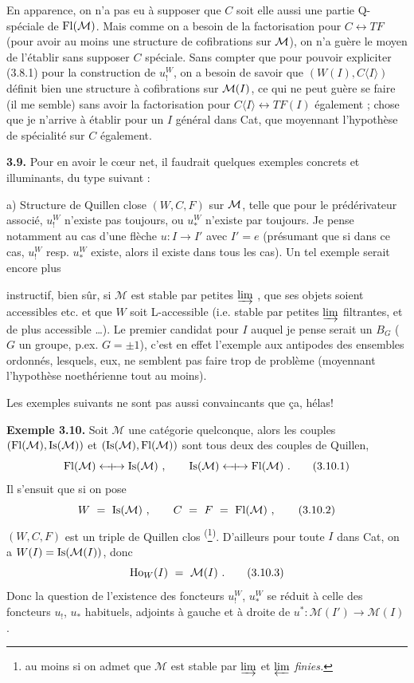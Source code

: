 En apparence, on n'a pas eu à supposer que $C$ soit elle aussi une partie Q-spéciale de $\mathrm{Fl}(\mathcal{M})$. Mais comme on a besoin de la factorisation pour $C\longleftrightarrow TF$ (pour avoir au moins une structure de cofibrations sur $\mathcal{M}$), on n'a guère le moyen de l'établir sans supposer $C$ spéciale. Sans compter que pour pouvoir expliciter (3.8.1) pour la construction de $u^{W}_{!}$, on a besoin de savoir que $(W(I),C\langle I\rangle)$ définit bien une structure à cofibrations sur $\mathcal{M}(I)$, ce qui ne peut guère se faire (il me semble) sans avoir la factorisation pour $C\langle I\rangle\longleftrightarrow TF(I)$ également ; chose que je n'arrive à établir pour un $I$ général dans Cat, que moyennant l'hypothèse de spécialité sur $C$ également.

\textbf{3.9.} Pour en avoir le cœur net, il faudrait quelques exemples concrets et illuminants, du type suivant :

a) Structure de Quillen close $(W,C,F)$ sur $\mathcal{M}$, telle que pour le prédérivateur associé, $u^{W}_{!}$ n'existe pas toujours, ou $u^{W}_{*}$ n'existe par toujours. Je pense notamment au cas d'une flèche $u : I\longrightarrow I'$ avec $I'=e$ (présumant que si dans ce cas, $u^{W}_{!}$ resp. $u^{W}_{*}$ existe, alors il existe dans tous les cas). Un tel exemple serait encore plus %

instructif, bien sûr, si $\mathcal{M}$ est stable par petites $\varinjlim$ , que ses objets soient accessibles etc. et que $W$ soit L-accessible (i.e. stable par petites $\varinjlim$ filtrantes, et de plus accessible \dots). Le premier candidat pour $I$ auquel je pense serait un $B_G$ ($G$ un groupe, p.ex. $G=\pm1$), c'est en effet l'exemple aux antipodes des ensembles ordonnés, lesquels, eux, ne semblent pas faire trop de problème (moyennant l'hypothèse noethérienne tout au moins).

Les exemples suivants ne sont pas aussi convaincants que ça, hélas!

\textbf{Exemple 3.10.} Soit $\mathcal{M}$ une catégorie quelconque, alors les couples $(\mathrm{Fl}(\mathcal{M}),\mathrm{Is}(\mathcal{M}))$ et $(\mathrm{Is}(\mathcal{M}),\mathrm{Fl}(\mathcal{M}))$ sont tous deux des couples de Quillen,
\[
\Fl(\mathcal{M}) \Qcouple \Is(\mathcal{M}) \ , \qquad \Is(\mathcal{M}) \Qcouple \Fl(\mathcal{M}) \ . \tag*{(3.10.1)} %
\]
Il s'ensuit que si on pose
\[
W \ = \ \mathrm{Is}(\mathcal{M}) \ , \qquad C \ = \ F \ = \ \mathrm{Fl}(\mathcal{M}) \ , \tag*{(3.10.2)}
\]
$(W,C,F)$ est un triple de Quillen clos \textsuperscript{(}\footnote[22]{au moins si on admet que $\mathcal{M}$ est stable par $\varinjlim$ et $\varprojlim$ \textit{finies.}}\textsuperscript{)}. D'ailleurs pour toute $I$ dans Cat, on a $W(I)=\mathrm{Is}(\mathcal{M}(I))$, donc
\[
\mathrm{Ho}_W(I) \ = \ \mathcal{M}(I) \ . \tag*{(3.10.3)}
\]
Donc la question de l'existence des foncteurs $u_!^W$, $u_*^W$ se réduit à celle des foncteurs $u_!$, $u_*$ habituels, adjoints à gauche et à droite de $u^* : \mathcal{M}(I') \longrightarrow \mathcal{M}(I)$.

